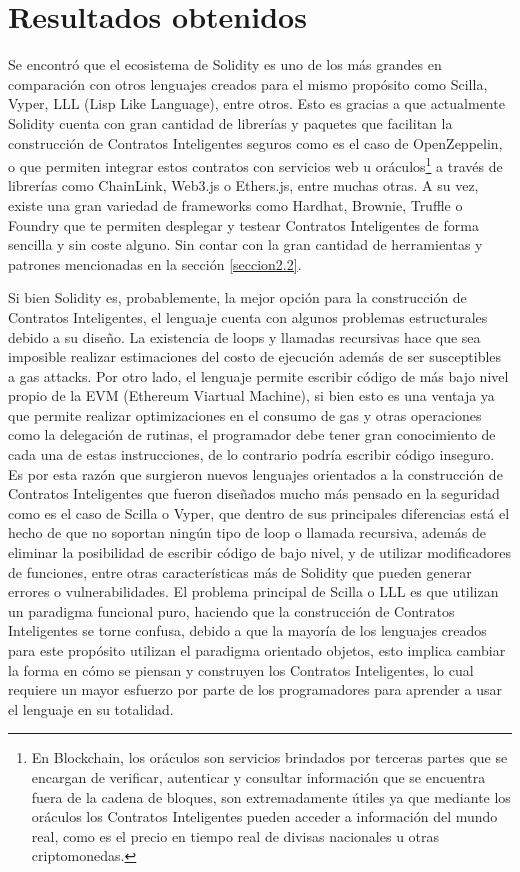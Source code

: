 \documentclass[a4paper,10pt]{article}
\begin{document}
	\section{Resultados obtenidos}
	Se encontró que el ecosistema de Solidity es uno de los más grandes en comparación con otros lenguajes creados para el mismo propósito como Scilla, Vyper, LLL (Lisp Like Language), entre otros. Esto es gracias a que actualmente Solidity cuenta con gran cantidad de librerías y paquetes que facilitan la construcción de Contratos Inteligentes seguros como es el caso de OpenZeppelin, o que permiten integrar estos contratos con servicios web u oráculos\footnote{En Blockchain, los oráculos son servicios brindados por terceras partes que se encargan de verificar, autenticar y consultar información que se encuentra fuera de la cadena de bloques, son extremadamente útiles ya que mediante los oráculos los Contratos Inteligentes pueden acceder a información del mundo real, como es el precio en tiempo real de divisas nacionales u otras criptomonedas.} a través de librerías como ChainLink, Web3.js o Ethers.js, entre muchas otras. A su vez, existe una gran variedad de frameworks como Hardhat, Brownie, Truffle o Foundry que te permiten desplegar y testear Contratos Inteligentes de forma sencilla y sin coste alguno. Sin contar con la gran cantidad de herramientas y patrones mencionadas en la sección \ref{seccion2.2}.
	
	Si bien Solidity es, probablemente, la mejor opción para la construcción de Contratos Inteligentes, el lenguaje cuenta con algunos problemas estructurales debido a su diseño. La existencia de loops y llamadas recursivas hace que sea imposible realizar estimaciones del costo de ejecución además de ser susceptibles a gas attacks. Por otro lado, el lenguaje permite escribir código de más bajo nivel propio de la EVM (Ethereum Viartual Machine), si bien esto es una ventaja ya que permite realizar optimizaciones en el consumo de gas y otras operaciones como la delegación de rutinas, el programador debe tener gran conocimiento de cada una de estas instrucciones, de lo contrario podría escribir código inseguro. Es por esta razón que surgieron nuevos lenguajes orientados a la construcción de Contratos Inteligentes que fueron diseñados mucho más pensado en la seguridad como es el caso de Scilla o Vyper, que dentro de sus principales diferencias está el hecho de que no soportan ningún tipo de loop o llamada recursiva, además de eliminar la posibilidad de escribir código de bajo nivel, y de utilizar modificadores de funciones, entre otras características más de Solidity que pueden generar errores o vulnerabilidades. El problema principal de Scilla o LLL es que utilizan un paradigma funcional puro, haciendo que la construcción de Contratos Inteligentes se torne confusa, debido a que la mayoría de los lenguajes creados para este propósito utilizan el paradigma orientado objetos, esto implica cambiar la forma en cómo se piensan y construyen los Contratos Inteligentes, lo cual requiere un mayor esfuerzo por parte de los programadores para aprender a usar el lenguaje en su totalidad.
	
\end{document}
